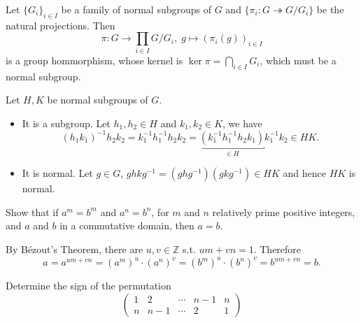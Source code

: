 \begin{solution}
    Let $\{G_{i}\}_{i\in I}$ be a family of normal subgroups of $G$ and $\{\pi_{i}\colon G\twoheadrightarrow G/G_{i}\}$ 
    be the natural projections. Then 
        \[
            \pi\colon G \to \prod_{i\in I}G/G_{i},\; g\mapsto (\pi_{i}(g))_{i\in I}
        \]
    is a group hommorphism, whose kernel is $\ker\pi=\bigcap_{i\in I}G_{i}$, which must be a normal subgroup.
\par Let $H,K$ be normal subgroups of $G$. 
    \begin{itemize}
        \item It is a subgroup. Let $h_{1},h_{2}\in H$ and $k_{1},k_{2}\in K$, we have
            \[
                (h_{1}k_{1})^{-1}h_{2}k_{2}=k_{1}^{-1}h_{1}^{-1}h_{2}k_{2}=\underbracket{(k_{1}^{-1}h_{1}^{-1}h_{2}k_{1})}_{\in H}k_{1}^{-1}k_{2}\in H K.
            \]
        \item It is normal. Let $g\in G$, $g h k g^{-1}=(g h g^{-1}) (g k g^{-1})\in H K$ and hence $H K$ is normal.
    \end{itemize}
\end{solution}

\setcounter{pb}{15}
\begin{problem}
    Show that if $ a^m = b^m $ and $ a^n = b^n $, for $ m $ and $ n $ relatively prime positive integers, and $ a $ and $ b $ in a commutative domain, then $ a = b $.
\end{problem}

\begin{solution}
    By B\'ezout's Theorem, there are $ u,v\in\mathbb{Z}$ s.t. $u m+v n=1$. Therefore
        \[
            a=a^{u m+v n}=(a^{m})^{u}\cdot(a^{n})^{v}=(b^{m})^{u}\cdot(b^{n})^{v}=b^{u m+v n}=b.
        \]
\end{solution}

\setcounter{pb}{16}
\begin{problem}
    Determine the sign of the permutation   
    \[
    \begin{pmatrix}
    1 & 2 & \cdots & n-1 & n \\
    n & n-1 & \cdots & 2 & 1
    \end{pmatrix}
    \]
\end{problem}

